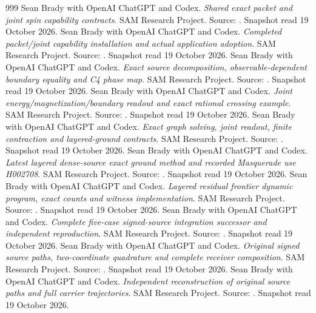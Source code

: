 \begin{thebibliography}{999}
 Sean Brady with OpenAI ChatGPT and Codex. \emph{Shared exact packet and joint spin capability contracts}. SAM Research Project. Source: . Snapshot read 19 October 2026.
 Sean Brady with OpenAI ChatGPT and Codex. \emph{Completed packet/joint capability installation and actual application adoption}. SAM Research Project. Source: . Snapshot read 19 October 2026.
 Sean Brady with OpenAI ChatGPT and Codex. \emph{Exact source decomposition, observable-dependent boundary equality and C4 phase map}. SAM Research Project. Source: . Snapshot read 19 October 2026.
 Sean Brady with OpenAI ChatGPT and Codex. \emph{Joint energy/magnetization/boundary readout and exact rational crossing example}. SAM Research Project. Source: . Snapshot read 19 October 2026.
 Sean Brady with OpenAI ChatGPT and Codex. \emph{Exact graph solving, joint readout, finite contraction and layered-ground contracts}. SAM Research Project. Source: . Snapshot read 19 October 2026.
 Sean Brady with OpenAI ChatGPT and Codex. \emph{Latest layered dense-source exact ground method and recorded Masquerade use H002708}. SAM Research Project. Source: . Snapshot read 19 October 2026.
 Sean Brady with OpenAI ChatGPT and Codex. \emph{Layered residual frontier dynamic program, exact counts and witness implementation}. SAM Research Project. Source: . Snapshot read 19 October 2026.
 Sean Brady with OpenAI ChatGPT and Codex. \emph{Complete five-case signed-source integration successor and independent reproduction}. SAM Research Project. Source: . Snapshot read 19 October 2026.
 Sean Brady with OpenAI ChatGPT and Codex. \emph{Original signed source paths, two-coordinate quadrature and complete receiver composition}. SAM Research Project. Source: . Snapshot read 19 October 2026.
 Sean Brady with OpenAI ChatGPT and Codex. \emph{Independent reconstruction of original source paths and full carrier trajectories}. SAM Research Project. Source: . Snapshot read 19 October 2026.

\end{thebibliography}
